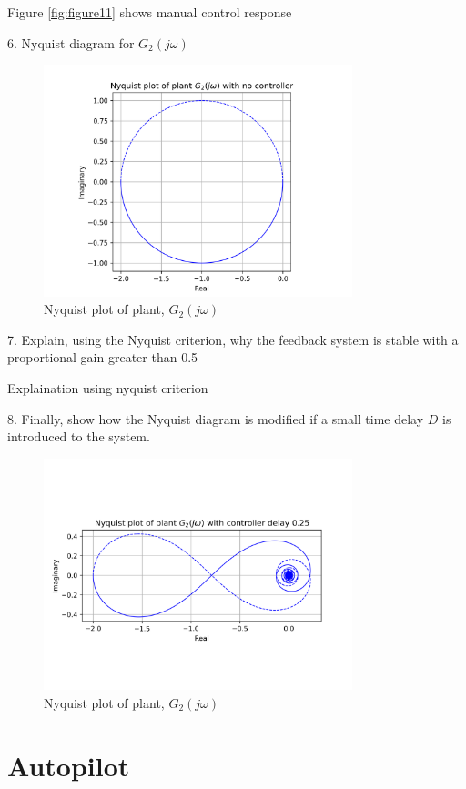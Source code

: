 \documentclass[8pt]{article}
\begin{document}
Figure \ref{fig:figure11} shows manual control response

6. Nyquist diagram for $G_2(j\omega)$
\begin{figure}[H]
    \centering
    \includegraphics[width=0.8\textwidth]{figures/nyquist2.png}
    \caption{Nyquist plot of plant, $G_2(j\omega)$}
    \label{fig:nyquist2}
\end{figure}
7. Explain, using the Nyquist criterion, why the feedback system is stable with a proportional gain greater than 0.5

Explaination using nyquist criterion

8. Finally, show how the Nyquist diagram is modified if a small time delay $D$ is introduced to the system.
\begin{figure}[H]
    \centering
    \includegraphics[width=0.8\textwidth]{figures/nyquist3.png}
    \caption{Nyquist plot of plant, $G_2(j\omega)$}
    \label{fig:nyquist3}
\end{figure}

\section{Autopilot}
\end{document}
